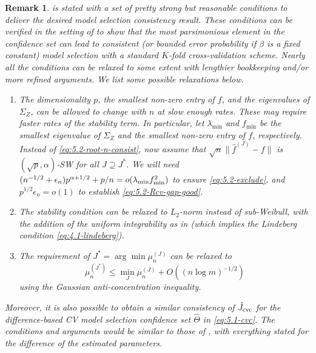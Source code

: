 \documentclass[11pt]{article}
\theoremstyle{plain}
\newtheorem{remark}[theorem]{Remark}
\begin{document}
\begin{remark}
    \label{rem:5.2-cvc-consist}
     is stated with a set of pretty strong but reasonable conditions to deliver the desired model selection consistency result. These conditions can be verified in the setting of  to show that the most parsimonious element in the confidence set can lead to consistent (or bounded error probability if $\beta$ is a fixed constant) model selection with a standard $K$-fold cross-validation scheme.  Nearly all the conditions can be relaxed to some extent with lengthier bookkeeping and/or more refined arguments.  We list some possible relaxations below.
    \begin{enumerate}
        \item The dimensionality $p$, the smallest non-zero entry of $f$, and the eigenvalues of $\Sigma_Z$, can be allowed to change with $n$ at slow enough rates.  These may require faster rates of the stability term.  In particular, let $\lambda_{\min}$ and $f_{\min}$ be the smallest eigenvalue of $\Sigma_Z$ and the smallest non-zero entry of $f$, respectively. Instead of \eqref{eq:5.2-root-n-consist}, now assume that $\sqrt{n}\|\hat f^{(J)}-f\|$ is $(\sqrt{p},\alpha)$-SW for all $J\supseteq J^*$.
        We will need $(n^{-1/2}+\epsilon_n)p^{\alpha+1/2}+p/n=o(\lambda_{\rm min} f_{\rm min}^2)$ to ensure \eqref{eq:5.2-exclude}, and 
        $p^{1/2}\epsilon_n=o(1)$ to establish \eqref{eq:5.2-Rcv-gap-good}.
        \item The stability condition can be relaxed to $L_2$-norm instead of sub-Weibull, with the addition of the uniform integrability as in  (which implies the Lindeberg condition \eqref{eq:4.1-lindeberg}).
        \item The requirement of $J^*=\arg\min\mu_n^{(J)}$ can be relaxed to $$\mu_{n}^{(J^*)}\le \min_J \mu_n^{(J)}+O((n\log m)^{-1/2})$$ using the Gaussian anti-concentration inequality.
    \end{enumerate}
    Moreover, it is also possible to obtain a similar consistency of $\hat J_{\rm cvc}$ for the difference-based CV model selection confidence set $\hat\Theta$ in \eqref{eq:5.1-cvc}.  The conditions and arguments would be similar to those of , with everything stated for the difference of the estimated parameters.
\end{remark}
\end{document}
